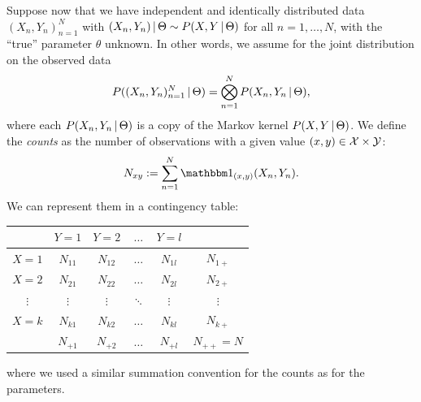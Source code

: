 Suppose now that we have independent and identically distributed data $(X_n,Y_n)_{n=1}^N$ with
$(X_n,Y_n) \operatorname*{|} \Theta \sim P(X,Y \operatorname*{|} \Theta)$ for all $n=1,\dots,N$, with the ``true'' parameter $\theta$
unknown.
In other words, we assume for the joint distribution on the observed data
$$P((X_n,Y_n)_{n=1}^N \operatorname*{|} \Theta) = \bigotimes_{n=1}^N P(X_n,Y_n \operatorname*{|} \Theta),$$
where each $P(X_n,Y_n \operatorname*{|} \Theta)$ is a copy of the Markov kernel $P(X,Y \operatorname*{|} \Theta)$.
We define the \emph{counts} as the number of observations with a given value $(x,y)\in\mathcal{X}\times\mathcal{Y}$:
$$N_{xy} := \sum_{n=1}^N \ind_{(x,y)}(X_n,Y_n).$$
We can represent them in a contingency table:
\begin{center}\begin{tabular}{c|cccc|c}
  & $Y=1$         & $Y=2$ & $\dots$ & $Y=l$ \\
  \hline
  $X=1$ & $N_{11}$      & $N_{12}$      & $\dots$ & $N_{1l}$ & $N_{1+}$\\
  $X=2$ & $N_{21}$      & $N_{22}$      & $\dots$ & $N_{2l}$ & $N_{2+}$\\
  $\vdots$ & $\vdots$     & $\vdots$       & $\ddots$ & $\vdots$  & $\vdots$ \\
  $X=k$ & $N_{k1}$      & $N_{k2}$      & $\dots$ & $N_{kl}$ & $N_{k+}$ \\
  \hline
  & $N_{+ 1}$ & $N_{+ 2}$ & $\dots$ & $N_{+ l}$ & $N_{++} = N$\\
\end{tabular}\end{center}
where we used a similar summation convention for the counts as for the parameters.

